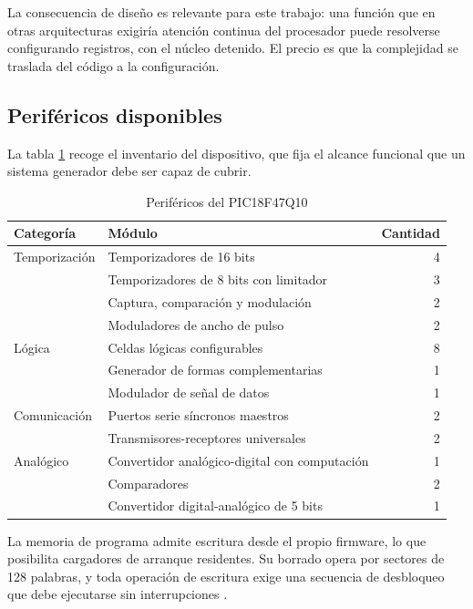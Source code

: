 La consecuencia de diseño es relevante para este trabajo: una función que en
otras arquitecturas exigiría atención continua del procesador puede resolverse
configurando registros, con el núcleo detenido. El precio es que la complejidad
se traslada del código a la configuración.

\subsection{Periféricos disponibles}

La tabla \ref{tab:perifericos} recoge el inventario del dispositivo, que fija el
alcance funcional que un sistema generador debe ser capaz de cubrir.

\begin{table}[H]
  \centering
  \caption{Periféricos del PIC18F47Q10 \cite{microchip2024ds40002043}}
  \label{tab:perifericos}
  \begin{tabular}{@{}llr@{}}
    \toprule
    \textbf{Categoría} & \textbf{Módulo} & \textbf{Cantidad} \\
    \midrule
    Temporización & Temporizadores de 16 bits & 4 \\
                  & Temporizadores de 8 bits con limitador & 3 \\
                  & Captura, comparación y modulación & 2 \\
                  & Moduladores de ancho de pulso & 2 \\
    \midrule
    Lógica        & Celdas lógicas configurables & 8 \\
                  & Generador de formas complementarias & 1 \\
                  & Modulador de señal de datos & 1 \\
    \midrule
    Comunicación  & Puertos serie síncronos maestros & 2 \\
                  & Transmisores-receptores universales & 2 \\
    \midrule
    Analógico     & Convertidor analógico-digital con computación & 1 \\
                  & Comparadores & 2 \\
                  & Convertidor digital-analógico de 5 bits & 1 \\
    \bottomrule
  \end{tabular}
\end{table}

La memoria de programa admite escritura desde el propio firmware, lo que
posibilita cargadores de arranque residentes. Su borrado opera por sectores de
128 palabras, y toda operación de escritura exige una secuencia de desbloqueo
que debe ejecutarse sin interrupciones \cite{microchip2024ds40002043}.

